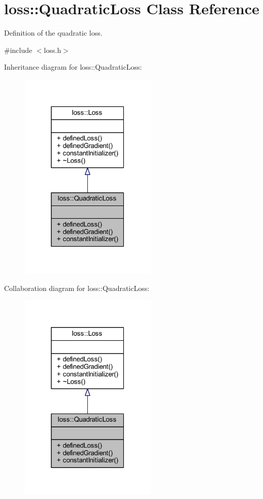 \hypertarget{classloss_1_1_quadratic_loss}{}\section{loss\+:\+:Quadratic\+Loss Class Reference}
\label{classloss_1_1_quadratic_loss}


Definition of the quadratic loss.  




{\ttfamily \#include $<$loss.\+h$>$}



Inheritance diagram for loss\+:\+:Quadratic\+Loss\+:\nopagebreak
\begin{figure}[H]
\begin{center}
\leavevmode
\includegraphics[width=187pt]{classloss_1_1_quadratic_loss__inherit__graph}
\end{center}
\end{figure}


Collaboration diagram for loss\+:\+:Quadratic\+Loss\+:\nopagebreak
\begin{figure}[H]
\begin{center}
\leavevmode
\includegraphics[width=187pt]{classloss_1_1_quadratic_loss__coll__graph}
\end{center}
\end{figure}
